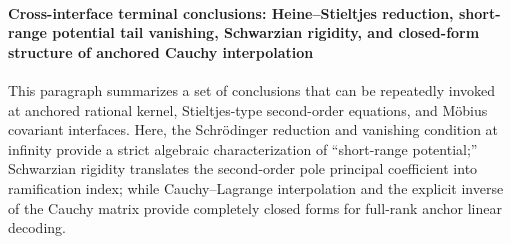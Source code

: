 
\paragraph{Cross-interface terminal conclusions: Heine--Stieltjes reduction, short-range potential tail vanishing, Schwarzian rigidity, and closed-form structure of anchored Cauchy interpolation}
This paragraph summarizes a set of conclusions that can be repeatedly invoked at anchored rational kernel, Stieltjes-type second-order equations, and Möbius covariant interfaces.
Here, the Schrödinger reduction and vanishing condition at infinity provide a strict algebraic characterization of ``short-range potential;''
Schwarzian rigidity translates the second-order pole principal coefficient into ramification index;
while Cauchy--Lagrange interpolation and the explicit inverse of the Cauchy matrix provide completely closed forms for full-rank anchor linear decoding.

